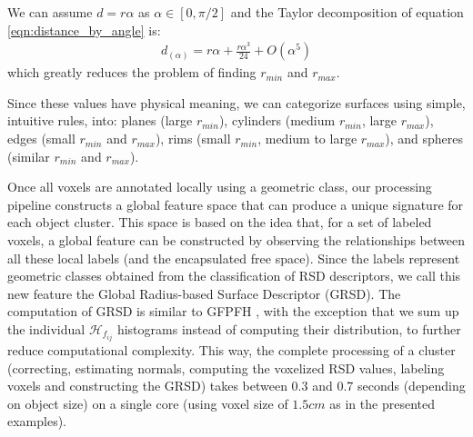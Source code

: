 \documentclass[conference]{sty/IEEEtran}
\def\cH{\mathcal{H}}
\begin{document}
We can assume $d = r \alpha$ as $\alpha \in [0,\pi/2]$ and the Taylor
decomposition of equation \ref{eqn:distance_by_angle} is:
\begin{align}
\label{eqn:taylor}
  d_{(\alpha)} = r \alpha + \frac{r \alpha^3}{24} + O(\alpha^5)
\end{align}
which greatly reduces the problem of finding $r_{min}$ and $r_{max}$.

Since these values have physical meaning, we can categorize surfaces using
simple, intuitive rules, into: planes (large $r_{min}$), cylinders (medium $r_{min}$,
large $r_{max}$), edges (small $r_{min}$ and $r_{max}$), rims (small $r_{min}$,
medium to large $r_{max}$), and spheres (similar $r_{min}$ and $r_{max}$).

Once all voxels are annotated locally using a geometric class, our
processing pipeline constructs a global feature space that can
produce a unique signature for each object cluster.  This space is
based on the idea that, for a set of labeled voxels, a
global feature can be constructed by observing the relationships between all
these local labels (and the encapsulated free space).
Since the labels represent geometric classes obtained
from the classification of RSD descriptors, we call this new feature the
Global Radius-based Surface Descriptor (GRSD).
The computation of GRSD is similar to GFPFH \cite{Rusu09ICCV-WS}, with the
exception that we sum up the individual $\cH_{f_{ij}}$ histograms instead of
computing their distribution, to further reduce computational complexity. This way,
the complete processing of a cluster (correcting, estimating normals,
computing the voxelized RSD values, labeling voxels and constructing the
GRSD) takes between 0.3 and 0.7 seconds (depending on object size) on a
single core (using voxel size of $1.5cm$ as in the presented examples).
\end{document}
